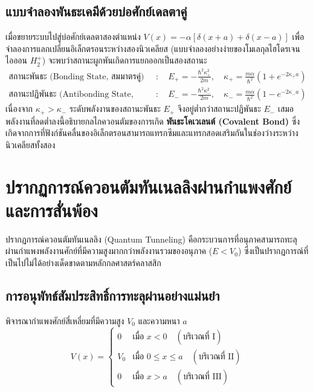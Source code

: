\subsection{แบบจำลองพันธะเคมีด้วยบ่อศักย์เดลตาคู่}
เมื่อขยายระบบไปสู่บ่อศักย์เดลตาสองตำแหน่ง $V(x) = -\alpha[\delta(x + a) + \delta(x - a)]$ เพื่อจำลองการแลกเปลี่ยนอิเล็กตรอนระหว่างสองนิวเคลียส (แบบจำลองอย่างง่ายของโมเลกุลไฮโดรเจนไอออน $H_2^+$) จะพบว่าสถานะผูกพันเกิดการแยกออกเป็นสองสถานะ
\begin{align}
\text{สถานะพันธะ (Bonding State, สมมาตรคู่)} \quad &\colon \quad E_+ = -\frac{\hbar^2\kappa_+^2}{2m}, \quad \kappa_+ = \frac{m\alpha}{\hbar^2}(1 + e^{-2\kappa_+ a}) \\
\text{สถานะปฏิพันธะ (Antibonding State, สมมาตรคี่)} \quad &\colon \quad E_- = -\frac{\hbar^2\kappa_-^2}{2m}, \quad \kappa_- = \frac{m\alpha}{\hbar^2}(1 - e^{-2\kappa_- a})
\end{align}
เนื่องจาก $\kappa_+ > \kappa_-$ ระดับพลังงานของสถานะพันธะ $E_+$ จึงอยู่ต่ำกว่าสถานะปฏิพันธะ $E_-$ เสมอ พลังงานที่ลดต่ำลงนี้อธิบายกลไกควอนตัมของการเกิด \textbf{พันธะโคเวเลนต์ (Covalent Bond)} ซึ่งเกิดจากการที่ฟังก์ชันคลื่นของอิเล็กตรอนสามารถแทรกซึมและแทรกสอดเสริมกันในช่องว่างระหว่างนิวเคลียสทั้งสอง

\section{ปรากฏการณ์ควอนตัมทันเนลลิงผ่านกำแพงศักย์และการสั่นพ้อง}
\label{sec_tunneling_resonances}

ปรากฏการณ์ควอนตัมทันเนลลิง (Quantum Tunneling) คือกระบวนการที่อนุภาคสามารถทะลุผ่านกำแพงพลังงานศักย์ที่มีความสูงมากกว่าพลังงานรวมของอนุภาค ($E < V_0$) ซึ่งเป็นปรากฏการณ์ที่เป็นไปไม่ได้อย่างเด็ดขาดตามหลักกลศาสตร์คลาสสิก

\subsection{การอนุพัทธ์สัมประสิทธิ์การทะลุผ่านอย่างแม่นยำ}
พิจารณากำแพงศักย์สี่เหลี่ยมที่มีความสูง $V_0$ และความหนา $a$
\begin{equation}
V(x) = \begin{cases}
0 & \text{เมื่อ } x < 0 \quad (\text{บริเวณที่ I}) \\
V_0 & \text{เมื่อ } 0 \le x \le a \quad (\text{บริเวณที่ II}) \\
0 & \text{เมื่อ } x > a \quad (\text{บริเวณที่ III})
\end{cases}
\end{equation}

